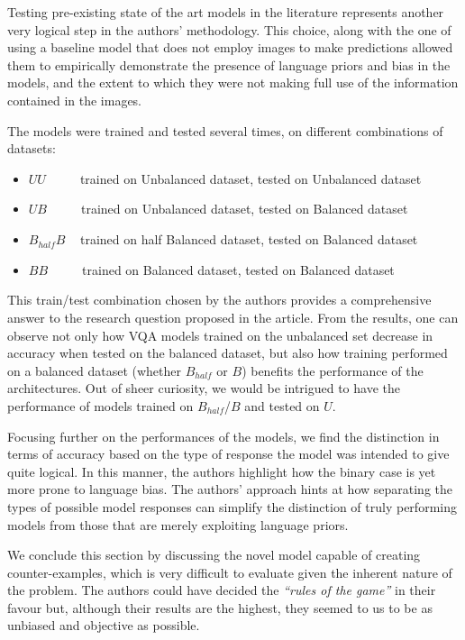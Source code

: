 \documentclass[letterpaper,11pt]{article}
\begin{document}
Testing pre-existing state of the art models in the literature represents another very logical step in the authors' methodology. This choice, along with the one of using a baseline model that does not employ images to make predictions allowed them to empirically demonstrate the presence of language priors and bias in the models, and the extent to which they were not making full use of the information contained in the images.

The models were trained and tested several times, on different combinations of datasets:
\begin{itemize}
  \itemsep-0.25em
  \item $UU$ \verb|    | trained on Unbalanced dataset, tested on Unbalanced dataset
  \item $UB$ \verb|    | trained on Unbalanced dataset, tested on Balanced dataset
  \item $B_{half}B$ \verb| | trained on half Balanced dataset, tested on Balanced dataset
  \item $BB$ \verb|    | trained on Balanced dataset, tested on Balanced dataset
\end{itemize}

This train/test combination chosen by the authors provides a comprehensive answer to the research question proposed in the article. From the results, one can observe not only how VQA models trained on the unbalanced set decrease in accuracy when tested on the balanced dataset, but also how training performed on a balanced dataset (whether $B_{half}$ or $B$) benefits the performance of the architectures. Out of sheer curiosity, we would be intrigued to have the performance of models trained on $B_{half}$/$B$ and tested on $U$.

Focusing further on the performances of the models, we find the distinction in terms of accuracy based on the type of response the model was intended to give quite logical. In this manner, the authors highlight how the binary case is yet more prone to language bias. The authors' approach hints at how separating the types of possible model responses can simplify the distinction of truly performing models from those that are merely exploiting language priors. 

We conclude this section by discussing the novel model capable of creating counter-examples, which is very difficult to evaluate given the inherent nature of the problem. The authors could have decided the \textit{``rules of the game''} in their favour but, although their results are the highest, they seemed to us to be as unbiased and objective as possible.
\end{document}

